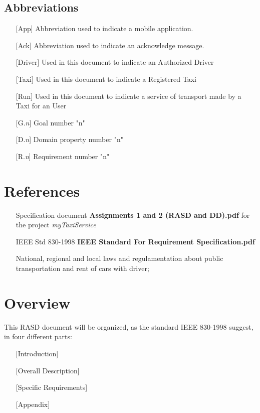 \documentclass[12pt,a4paper]{book}
\begin{document}
			\subsection{Abbreviations}
				\begin{itemize}
					\item[\textbullet] [App] Abbreviation used to indicate a mobile application.
					\item[\textbullet] [Ack] Abbreviation used to indicate an acknowledge message.
					\item[\textbullet] [Driver] Used in this document to indicate an Authorized Driver
					\item[\textbullet] [Taxi] Used in this document to indicate a Registered Taxi
					\item[\textbullet] [Run] Used in this document to indicate a service of transport made by a Taxi for an User
					\item[\textbullet] [G.\textit{n}] Goal number "n"
					\item[\textbullet] [D.\textit{n}] Domain property number "n"
					\item[\textbullet] [R.\textit{n}] Requirement number "n"
				\end{itemize}
		\section{References}
			\begin{itemize}
				\item[\textbullet] Specification document \textbf{Assignments 1 and 2 (RASD and DD).pdf} for the project \textit{myTaxiService}
				\item[\textbullet] IEEE Std 830-1998 \textbf{IEEE Standard For Requirement Specification.pdf}
				\item[\textbullet] National, regional and local laws and regulamentation about public transportation and rent of cars with driver;
			\end{itemize}
		\section{Overview}
			This RASD document will be organized, as the standard IEEE 830-1998 suggest, in four different parts:
			\begin{itemize}
				\item[\textbullet] [Introduction]
				\item[\textbullet] [Overall Description]
				\item[\textbullet] [Specific Requirements]
				\item[\textbullet] [Appendix]
			\end{itemize}
\end{document}

